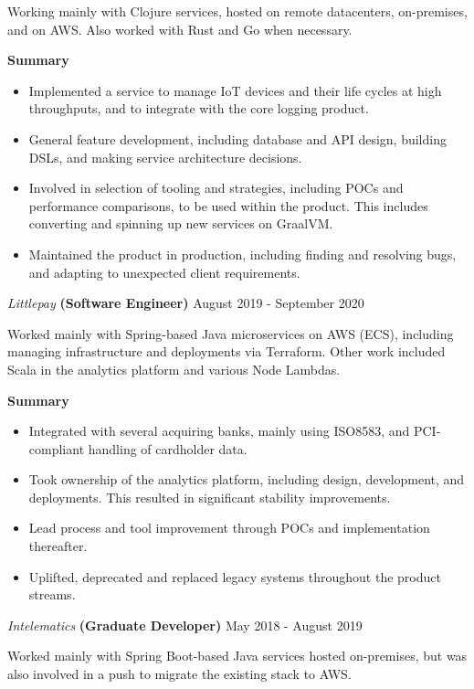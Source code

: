 \documentclass[margin, 11pt]{style}
\begin{document}
\begin{resume}
Working mainly with Clojure services, hosted on remote datacenters, on-premises, and on AWS. Also worked with Rust and Go when necessary.

\textbf{Summary}

\begin{itemize}
\item Implemented a service to manage IoT devices and their life cycles at high throughputs, and to integrate with the core logging product.
\item General feature development, including database and API design, building DSLs, and making service architecture decisions.
\item Involved in selection of tooling and strategies, including POCs and performance comparisons, to be used within the product. This includes converting and spinning up new services on GraalVM.
\item Maintained the product in production, including finding and resolving bugs, and adapting to unexpected client requirements. 
\end{itemize}

\pagebreak

{\sl Littlepay} \textbf{(Software Engineer)} \hfill August 2019 - September 2020

Worked mainly with Spring-based Java microservices on AWS (ECS), including managing infrastructure and deployments via Terraform. Other work included Scala in the analytics platform and various Node Lambdas.

\textbf{Summary}

\begin{itemize}
\item Integrated with several acquiring banks, mainly using ISO8583, and PCI-compliant handling of cardholder data.
\item Took ownership of the analytics platform, including design, development, and deployments. This resulted in significant stability improvements.
\item Lead process and tool improvement through POCs and implementation thereafter.
\item Uplifted, deprecated and replaced legacy systems throughout the product streams.
\end{itemize}

\vspace{15pt}
{\sl Intelematics} \textbf{(Graduate Developer)} \hfill May 2018 - August 2019

Worked mainly with Spring Boot-based Java services hosted on-premises, but was also involved in a push to migrate the existing stack to AWS.


\end{resume}
\end{document}
